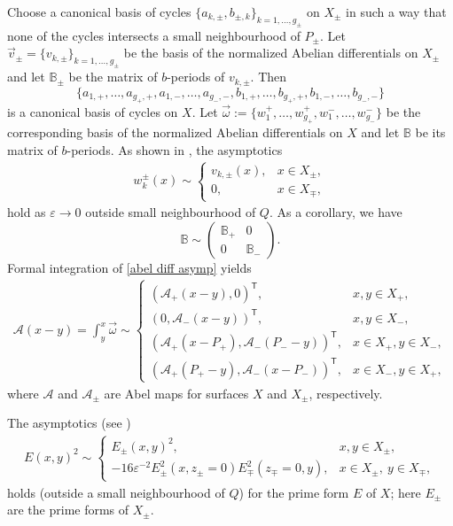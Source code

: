 \documentclass[pdftex]{sigma}
\numberwithin{equation}{section}
\theoremstyle{definition}
\begin{document}
Choose a canonical basis of cycles $\{a_{k,\pm},b_{\pm,k}\}_{k=1,\dots,g_{\pm}}$ on $X_\pm$ in such a way that none of the cycles intersects a small neighbourhood of $P_\pm$. Let $\vec{v}_\pm=\{v_{k,\pm}\}_{k=1,\dots,g_\pm}$ be the basis of the normalized Abelian differentials on $X_\pm$ and let $\mathbb{B}_\pm$ be the matrix of $b$-periods of $v_{k,\pm}$. Then
\[\big\{a_{1,+},\dots,a_{g_+,+},a_{1,-},\dots,a_{g_-,-},b_{1,+},\dots,b_{g_+,+},b_{1,-},\dots,b_{g_-,-}\big\}\]
is a canonical basis of cycles on $X$. Let $\vec{\omega}:=\{w_{1}^{+},\dots,w_{g_+}^{+},w_{1}^{-},\dots,w_{g_-}^{-}\}$ be the corresponding basis of the normalized Abelian differentials on $X$ and let $\mathbb{B}$ be its matrix of $b$-periods. As shown in \cite[Lemmas 1 and 2]{KokTAMS}, the asymptotics
\begin{gather}
\label{abel diff asymp}
w_{k}^{\pm}(x)\sim\begin{cases}
v_{k,\pm}(x), & x\in X_\pm,\\
0, & x\in X_\mp,
\end{cases}
\end{gather}
hold as $\varepsilon\to 0$ outside small neighbourhood of $Q$. As a corollary, we have
\begin{equation}
\label{priod matr asymp}
\mathbb{B}\sim\left(\begin{matrix}
\mathbb{B}_+ & 0\\
0 & \mathbb{B}_-
\end{matrix}\right).
\end{equation}
Formal integration of \eqref{abel diff asymp} yields
\begin{gather}
\label{abel map asymp}
\mathscr{A}(x-y)=\int_y^x\vec{\omega}\sim\begin{cases}
(\mathscr{A}_+(x-y),0)^{\mathsf T}, & x,y\in X_+,\\
(0,\mathscr{A}_-(x-y))^{\mathsf T}, & x,y\in X_-,\\
(\mathscr{A}_+(x-P_+),\mathscr{A}_-(P_--y))^{\mathsf T}, & x\in X_+, y\in X_-,\\
(\mathscr{A}_+(P_+-y),\mathscr{A}_-(x-P_-))^{\mathsf T}, & x\in X_-, y\in X_+,
\end{cases}
\end{gather}
where $\mathscr{A}$ and $\mathscr{A}_\pm$ are Abel maps for surfaces $X$ and $X_\pm$, respectively.

The asymptotics (see \cite[formulas (2.33) and (2.34)]{KokTAMS})
\begin{align}
\label{prime form asymp}
E(x,y)^2\sim\begin{cases}
E_\pm(x,y)^2, & x,y\in X_\pm, \\
-16\varepsilon^{-2}E_\pm^2(x,z_\pm=0)E^2_\mp(z_\mp=0,y), & x\in X_\pm, \ y\in X_\mp,
\end{cases}
\end{align}
holds (outside a small neighbourhood of $Q$) for the prime form $E$ of $X$; here $E_\pm$ are the prime forms of $X_\pm$.
\end{document}
